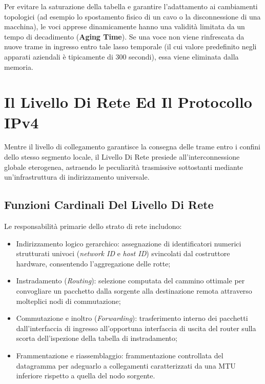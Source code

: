 \documentclass[11pt, a4paper]{article}
\begin{document}

Per evitare la saturazione della tabella e garantire l'adattamento ai cambiamenti topologici (ad esempio lo spostamento fisico di un cavo o la disconnessione di una macchina), le voci apprese dinamicamente hanno una validità limitata da un tempo di decadimento (\textbf{Aging Time}). Se una voce non viene rinfrescata da nuove trame in ingresso entro tale lasso temporale (il cui valore predefinito negli apparati aziendali è tipicamente di 300 secondi), essa viene eliminata dalla memoria.

\newpage

\section{Il Livello Di Rete Ed Il Protocollo IPv4}

Mentre il livello di collegamento garantisce la consegna delle trame entro i confini dello stesso segmento locale, il Livello Di Rete presiede all'interconnessione globale eterogenea, astraendo le peculiarità trasmissive sottostanti mediante un'infrastruttura di indirizzamento universale.


\subsection{Funzioni Cardinali Del Livello Di Rete}

Le responsabilità primarie dello strato di rete includono:
\begin{itemize}
    \item Indirizzamento logico gerarchico: assegnazione di identificatori numerici strutturati univoci (\emph{network ID} e \emph{host ID}) svincolati dal costruttore hardware, consentendo l'aggregazione delle rotte;
    \item Instradamento (\emph{Routing}): selezione computata del cammino ottimale per convogliare un pacchetto dalla sorgente alla destinazione remota attraverso molteplici nodi di commutazione;
    \item Commutazione e inoltro (\emph{Forwarding}): trasferimento interno dei pacchetti dall'interfaccia di ingresso all'opportuna interfaccia di uscita del router sulla scorta dell'ispezione della tabella di instradamento;
    \item Frammentazione e riassemblaggio: frammentazione controllata del datagramma per adeguarlo a collegamenti caratterizzati da una MTU inferiore rispetto a quella del nodo sorgente.
\end{itemize}
\end{document}
